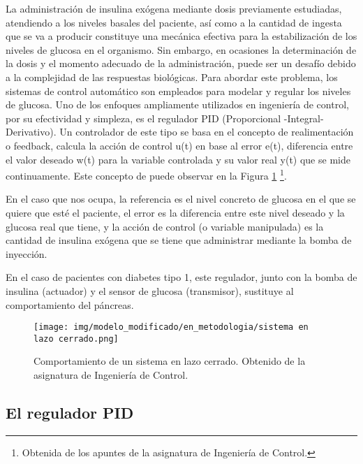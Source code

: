 La administración de insulina exógena mediante dosis previamente estudiadas, atendiendo a los niveles basales del paciente, así como a la cantidad de ingesta que se va a producir constituye una mecánica efectiva para la estabilización de los niveles de glucosa en el organismo. Sin embargo, en ocasiones la determinación de la dosis y el momento adecuado de la administración, puede ser un desafío debido a la complejidad de las respuestas biológicas. 
Para abordar este problema, los sistemas de control automático son empleados para modelar y regular los niveles de glucosa. Uno de los enfoques ampliamente utilizados en ingeniería de control, por su efectividad y simpleza, es el regulador PID (Proporcional -Integral- Derivativo). Un controlador de este tipo se basa en el concepto de realimentación o feedback, calcula la acción de control u(t) en base al error e(t), diferencia entre el valor deseado w(t) para la variable controlada y su valor real y(t)  que se mide continuamente. Este concepto de puede observar en la Figura \ref{fig:lazo_cerrado} \footnote{Obtenida de los apuntes de la asignatura de Ingeniería de Control.}.

En el caso que nos ocupa, la referencia es el nivel concreto de glucosa en el que se quiere que esté el paciente, el error es la diferencia entre este nivel deseado y la glucosa real que tiene, y la acción de control (o variable manipulada) es la cantidad de insulina exógena que se tiene que administrar mediante la bomba de inyección.

En el caso de pacientes con diabetes tipo 1, este regulador, junto con la bomba de insulina (actuador) y el sensor de glucosa (transmisor), sustituye al comportamiento del páncreas.
\begin{figure}[htbp]
    \centering
    \texttt{[image: img/modelo\_modificado/en\_metodologia/sistema en lazo cerrado.png]}
    \caption{Comportamiento de un sistema en lazo cerrado. Obtenido de la asignatura de Ingeniería de Control.}
    \label{fig:lazo_cerrado}
\end{figure}

\subsection{El regulador PID}

